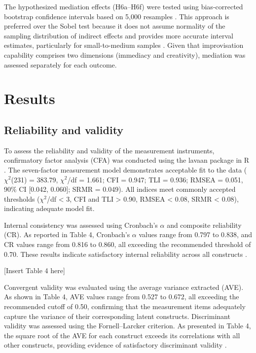 \documentclass[authoryear,preprint,review,times,10pt]{elsarticle}
\begin{document}
The hypothesized mediation effects (H6a--H6f) were tested using bias-corrected bootstrap confidence intervals based on 5,000 resamples \citep{preacher2008Asymptotic}. This approach is preferred over the Sobel test because it does not assume normality of the sampling distribution of indirect effects and provides more accurate interval estimates, particularly for small-to-medium samples \citep{preacher2008Asymptotic}. Given that improvisation capability comprises two dimensions (immediacy and creativity), mediation was assessed separately for each outcome.

\section{Results}
\subsection{Reliability and validity}
To assess the reliability and validity of the measurement instruments, confirmatory factor analysis (CFA) was conducted using the lavaan package in R \citep{rosseel2012Lavaan}. The seven-factor measurement model demonstrates acceptable fit to the data ($\chi^{2}$(231) = 383.79, $\chi^{2}$/df = 1.661; CFI = 0.947; TLI = 0.936; RMSEA = 0.051, 90\% CI [0.042, 0.060]; SRMR = 0.049). All indices meet commonly accepted thresholds ($\chi^{2}$/df < 3, CFI and TLI > 0.90, RMSEA < 0.08, SRMR < 0.08), indicating adequate model fit.

Internal consistency was assessed using Cronbach's $\alpha$ and composite reliability (CR). As reported in Table 4, Cronbach's $\alpha$ values range from 0.797 to 0.838, and CR values range from 0.816 to 0.860, all exceeding the recommended threshold of 0.70. These results indicate satisfactory internal reliability across all constructs \citep{eisinga2019Building}.

\begin{center}[Insert Table 4 here]\end{center}

Convergent validity was evaluated using the average variance extracted (AVE). As shown in Table 4, AVE values range from 0.527 to 0.672, all exceeding the recommended cutoff of 0.50, confirming that the measurement items adequately capture the variance of their corresponding latent constructs. Discriminant validity was assessed using the Fornell--Larcker criterion. As presented in Table 4, the square root of the AVE for each construct exceeds its correlations with all other constructs, providing evidence of satisfactory discriminant validity \citep{chen2007Sensitivity, li2019When}.
\end{document}
